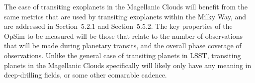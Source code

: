 The case of transiting exoplanets in the Magellanic Clouds will benefit
from the same metrics that are used by transiting exoplanets within the
Milky Way, and are addressed in Section~5.2.1 and Section~5.5.2. The key
properties of the OpSim to be measured will be those that relate to the
number of observations that will be made during planetary transits, and
the overall phase coverage of observations. Unlike the general case of
transiting planets in LSST, transiting planets in the Magellanic Clouds
specifically will likely only have any meaning in deep-drilling fields,
or some other comarable cadence.

%
%
%
%
%
%
%
